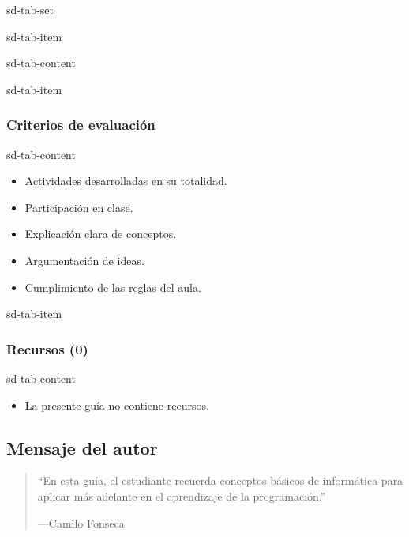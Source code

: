 \documentclass[letterpaper,10pt,spanish]{sphinxmanual}
\begin{document}
\begin{sphinxuseclass}{sd-tab-set}
\begin{sphinxuseclass}{sd-tab-item}
\begin{sphinxuseclass}{sd-tab-content}
\begin{itemize}
\end{itemize}

\end{sphinxuseclass}
\end{sphinxuseclass}
\begin{sphinxuseclass}{sd-tab-item}\subsubsection*{Criterios de evaluación}

\begin{sphinxuseclass}{sd-tab-content}\begin{itemize}
\item {} 
\sphinxAtStartPar
Actividades desarrolladas en su totalidad.

\item {} 
\sphinxAtStartPar
Participación en clase.

\item {} 
\sphinxAtStartPar
Explicación clara de conceptos.

\item {} 
\sphinxAtStartPar
Argumentación de ideas.

\item {} 
\sphinxAtStartPar
Cumplimiento de las reglas del aula.

\end{itemize}

\end{sphinxuseclass}
\end{sphinxuseclass}
\begin{sphinxuseclass}{sd-tab-item}\subsubsection*{Recursos (0)}

\begin{sphinxuseclass}{sd-tab-content}\begin{itemize}
\item {} 
\sphinxAtStartPar
La presente guía no contiene recursos.

\end{itemize}

\end{sphinxuseclass}
\end{sphinxuseclass}
\end{sphinxuseclass}

\subsection{Mensaje del autor}
\label{\detokenize{1_guias/10programacion/G1022:mensaje-del-autor}}\begin{quote}

\sphinxAtStartPar
“En esta guía, el estudiante recuerda conceptos básicos de informática para aplicar más adelante en el aprendizaje de la programación.”

\begin{flushright}
---Camilo Fonseca
\end{flushright}
\end{quote}
\end{document}
